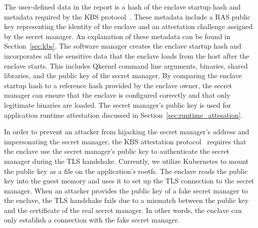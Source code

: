 The user-defined data in the report is a hash of the enclave startup hash and metadata required by the KBS protocol~\cite*{kbs_Attestation_protocol}. These metadata include a RAS public key representing the identity of the enclave and an attestation challenge assigned by the secret manager. An explanation of these metadata can be found in Section~\ref{sec:kbs}. 
The software manager creates the enclave startup hash and incorporates all the sensitive data that the enclave loads from the host after the enclave starts. This includes Qkernel command line arguments, binaries, shared libraries, and the public key of the secret manager. By comparing the enclave startup hash to a reference hash provided by the enclave owner, the secret manager can ensure that 
the enclave is configured correctly and that only legitimate binaries are loaded. The secret manager's public key is used for application runtime attestation discussed in Section~\ref{sec:runtime_attesation}.

In order to prevent an attacker from hijacking the secret manager's address and impersonating the secret manager, the KBS attestation protocol~\cite*{kbs_Attestation_protocol} requires that the enclave use the secret manager's public key to authenticate the secret manager during the TLS handshake. Currently, we utilize Kubernetes to mount the public key as a file on the application's rootfs. 
The enclave reads the public key into the guest memory and uses it to set up the TLS connection to the secret manager. When an attacker provides the public key of a fake secret manager to the enclave, the TLS handshake fails due to a mismatch between the public key and the certificate of the real secret manager. In other words, the enclave can only establish a 
connection with the fake secret manager.

